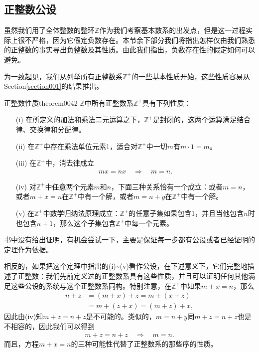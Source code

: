 \subsection{正整数公设}
虽然我们用了全体整数的整环$\mathbb{Z}$作为我们考察基本数系的出发点，但是这一过程实际上很不严格，因为它假定负数存在。本节余下部分我们将指出怎样仅由我们熟悉的正整数的事实导出负整数及其性质。由此我们指出，负数存在性的假定如何可以避免。

为一致起见，我们从列举所有正整数系$\mathbb{Z}^+$的一些基本性质开始，这些性质容易从Section\ref{section001}的结果推出。
\begin{theorem}{正整数性质}{theorem0042}
$\mathbb{Z}$中所有正整数系$\mathbb{Z}^+$具有下列性质：
\begin{enumerate}
\item[(i)] 在所定义的加法和乘法二元运算之下，$\mathbb{Z}^+$是封闭的，这两个运算满足结合律、交换律和分配律。
\item[(ii)] 在$\mathbb{Z}^+$中存在乘法单位元素1，适合对$\mathbb{Z}^+$中一切$m$有$m \cdot 1 = m$。
\item[(iii)] 在$\mathbb{Z}^+$中，消去律成立
\begin{gather}\label{equation0040}
mx=nx\quad\Rightarrow\quad m=n.
\end{gather}
\item[(iv)] 对$\mathbb{Z}^+$中任意两个元素$m$和$n$，下面三种关系恰有一个成立：或者$m=n$，或者$m+x=n$在$\mathbb{Z}^+$中有一个解，或者$m=n+y$在$\mathbb{Z}^+$中有一个解。
\item[(v)] 在$\mathbb{Z}^+$中数学归纳法原理成立：$\mathbb{Z}^+$的任意子集如果包含1，并且当他包含$n$时也包含$n+1$，那么这个子集包含$\mathbb{Z}^+$中每一个元素。
\end{enumerate}
\end{theorem}

书中没有给出证明，有机会尝试一下，主要是保证每一步都有公设或者已经证明的定理作为依据。

相反的，如果把这个定理中指出的(i)\textasciitilde(v)看作公设，在下述意义下，它们完整地描述了正整数：我们先前定义过的正整数系具有这些性质，并且可以证明任何其他满足这些公设的系统与这个正整数系同构。特别注意，在$\mathbb{Z}^+$中如果$m+x=n$，那么
\[
\begin{aligned}
n+z &= (m+x)+z = m+(x+z)\\
&=m+(z+x) = (m+z)+x,
\end{aligned}
\]
因此由(iv)知$m+z=n+z$是不可能的。类似的，$m=n+y$同$m+z=n+z$也是不相容的，因此我们可以得到
\begin{gather}\label{equation0041}
m+z=n+z \quad \Rightarrow\quad m=n.
\end{gather}
而且，方程$m+x=n$的三种可能性代替了正整数系的那些序的性质。

